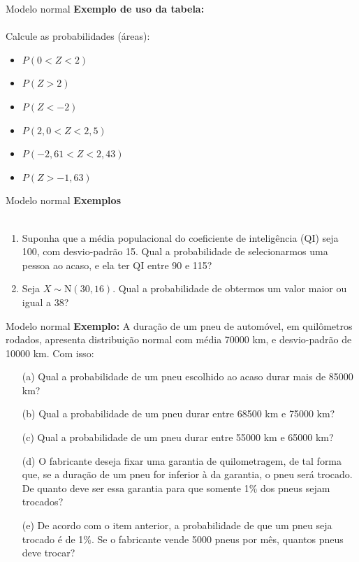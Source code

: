 \documentclass[10pt]{beamer}\usepackage[]{graphicx}\usepackage[]{color}
\providecommand{\N}{\text{N}}
\theoremstyle{definition}
\begin{document}
\begin{frame}[fragile]{Modelo normal}
  \textbf{Exemplo de uso da tabela:} \\~\\
  Calcule as probabilidades (áreas):
  \begin{itemize}
  \item $P(0 < Z < 2)$
  \item $P(Z > 2)$
  \item $P(Z < -2)$
  \item $P(2,0 < Z < 2,5)$
  \item $P(-2,61 < Z < 2,43)$
  \item $P(Z > -1,63)$
  \end{itemize}
\end{frame}

\begin{frame}[fragile]{Modelo normal}
  \textbf{Exemplos} \\~\\
  \begin{enumerate}
  \item Suponha que a média populacional do coeficiente de inteligência
    (QI) seja 100, com desvio-padrão 15. Qual a probabilidade de
    selecionarmos uma pessoa ao acaso, e ela ter QI entre 90 e 115?
  \item Seja $X \sim \N(30, 16)$. Qual a probabilidade de obtermos um
    valor maior ou igual a 38?
  \end{enumerate}
\end{frame}

\begin{frame}[fragile]{Modelo normal}
  \textbf{Exemplo:} A duração de um pneu de automóvel, em quilômetros
  rodados, apresenta distribuição normal com média 70000 km, e
  desvio-padrão de 10000 km. Com isso:
  \begin{itemize}
  \item[(a)] Qual a probabilidade de um pneu escolhido ao acaso durar mais de
    85000 km?
  \item[(b)] Qual a probabilidade de um pneu durar entre 68500 km e 75000 km?
  \item[(c)] Qual a probabilidade de um pneu durar entre 55000 km e 65000 km?
  \item[(d)] O fabricante deseja fixar uma garantia de quilometragem, de tal
    forma que, se a duração de um pneu for inferior à da garantia, o
    pneu será trocado. De quanto deve ser essa garantia para que somente
    1\% dos pneus sejam trocados?
  \item[(e)] De acordo com o item anterior, a probabilidade de que um pneu
    seja trocado é de 1\%. Se o fabricante vende 5000 pneus por mês,
    quantos pneus deve trocar?
  \end{itemize}
\end{frame}
\end{document}
